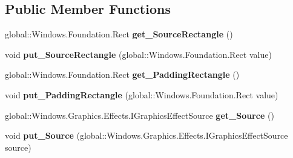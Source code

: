 \subsection*{Public Member Functions}
\begin{DoxyCompactItemize}
\item 
\mbox{\label{interface_microsoft_1_1_graphics_1_1_canvas_1_1_effects_1_1_i_atlas_effect_ae7978fa49d558705d8c17ef6218fd37d}} 
global\+::\+Windows.\+Foundation.\+Rect {\bfseries get\+\_\+\+Source\+Rectangle} ()
\item 
\mbox{\label{interface_microsoft_1_1_graphics_1_1_canvas_1_1_effects_1_1_i_atlas_effect_a8bb2c844e943521e57ecaf5ec818c6b9}} 
void {\bfseries put\+\_\+\+Source\+Rectangle} (global\+::\+Windows.\+Foundation.\+Rect value)
\item 
\mbox{\label{interface_microsoft_1_1_graphics_1_1_canvas_1_1_effects_1_1_i_atlas_effect_af69ac10c9202acf84c6c06821df3549a}} 
global\+::\+Windows.\+Foundation.\+Rect {\bfseries get\+\_\+\+Padding\+Rectangle} ()
\item 
\mbox{\label{interface_microsoft_1_1_graphics_1_1_canvas_1_1_effects_1_1_i_atlas_effect_ae8547dbe3cad6fcce77f4a55bd9392be}} 
void {\bfseries put\+\_\+\+Padding\+Rectangle} (global\+::\+Windows.\+Foundation.\+Rect value)
\item 
\mbox{\label{interface_microsoft_1_1_graphics_1_1_canvas_1_1_effects_1_1_i_atlas_effect_a6c75904e9cca0dba312800b7ed419978}} 
global\+::\+Windows.\+Graphics.\+Effects.\+I\+Graphics\+Effect\+Source {\bfseries get\+\_\+\+Source} ()
\item 
\mbox{\label{interface_microsoft_1_1_graphics_1_1_canvas_1_1_effects_1_1_i_atlas_effect_a7813198d1247fd31acb6aaf1aa5bf8db}} 
void {\bfseries put\+\_\+\+Source} (global\+::\+Windows.\+Graphics.\+Effects.\+I\+Graphics\+Effect\+Source source)

\end{DoxyCompactItemize}
